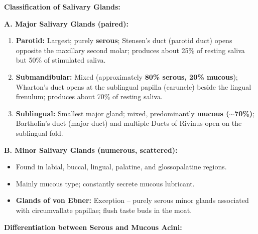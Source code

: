 \documentclass[11pt,a4paper]{article}
\begin{document}
\begin{ansbox}
\textbf{Classification of Salivary Glands:}

\textbf{A. Major Salivary Glands (paired):}
\begin{enumerate}[leftmargin=*]
    \item \textbf{Parotid:} Largest; purely \textbf{serous}; Stensen's duct (parotid duct) opens opposite the maxillary second molar; produces about 25\% of resting saliva but 50\% of stimulated saliva.
    \item \textbf{Submandibular:} Mixed (approximately \textbf{80\% serous, 20\% mucous}); Wharton's duct opens at the sublingual papilla (caruncle) beside the lingual frenulum; produces about 70\% of resting saliva.
    \item \textbf{Sublingual:} Smallest major gland; mixed, predominantly \textbf{mucous ($\sim$70\%)}; Bartholin's duct (major duct) and multiple Ducts of Rivinus open on the sublingual fold.
\end{enumerate}

\textbf{B. Minor Salivary Glands (numerous, scattered):}
\begin{itemize}[leftmargin=*]
    \item Found in labial, buccal, lingual, palatine, and glossopalatine regions.
    \item Mainly mucous type; constantly secrete mucous lubricant.
    \item \textbf{Glands of von Ebner:} Exception -- purely serous minor glands associated with circumvallate papillae; flush taste buds in the moat.
\end{itemize}

\textbf{Differentiation between Serous and Mucous Acini:}


\end{ansbox}
\end{document}
